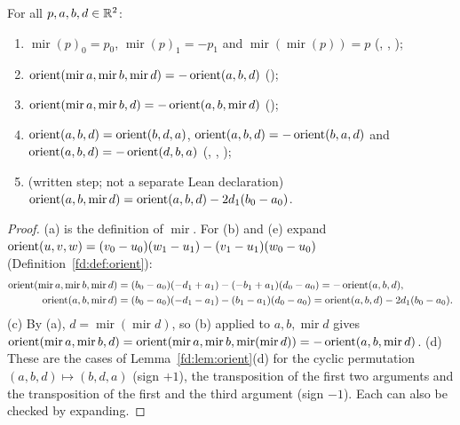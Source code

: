 \begin{lemma}\label{mm:lem:orient-mir}
For all $p,a,b,d\in\mathbb R^2$:
\begin{enumerate}[label=(\alph*)]
\item $\operatorname{mir}(p)_0=p_0$, $\operatorname{mir}(p)_1=-p_1$ and $\operatorname{mir}(\operatorname{mir}(p))=p$
  (, , );
\item $\operatorname{orient}(\operatorname{mir}a,\operatorname{mir}b,\operatorname{mir}d)=-\operatorname{orient}(a,b,d)$ ();
\item $\operatorname{orient}(\operatorname{mir}a,\operatorname{mir}b,d)=-\operatorname{orient}(a,b,\operatorname{mir}d)$ ();
\item $\operatorname{orient}(a,b,d)=\operatorname{orient}(b,d,a)$, $\operatorname{orient}(a,b,d)=-\operatorname{orient}(b,a,d)$ and $\operatorname{orient}(a,b,d)=-\operatorname{orient}(d,b,a)$
  (, , );
\item (written step; not a separate Lean declaration)
  $\operatorname{orient}(a,b,\operatorname{mir}d)=\operatorname{orient}(a,b,d)-2d_1(b_0-a_0)$.
\end{enumerate}
\end{lemma}

\begin{proof}
(a) is the definition of $\operatorname{mir}$. For (b) and (e) expand
$\operatorname{orient}(u,v,w)=(v_0-u_0)(w_1-u_1)-(v_1-u_1)(w_0-u_0)$ (Definition~\ref{fd:def:orient}):
\begin{align*}
\operatorname{orient}(\operatorname{mir}a,\operatorname{mir}b,\operatorname{mir}d)
  &=(b_0-a_0)(-d_1+a_1)-(-b_1+a_1)(d_0-a_0)=-\operatorname{orient}(a,b,d),\\
\operatorname{orient}(a,b,\operatorname{mir}d)
  &=(b_0-a_0)(-d_1-a_1)-(b_1-a_1)(d_0-a_0)=\operatorname{orient}(a,b,d)-2d_1(b_0-a_0).
\end{align*}
(c) By (a), $d=\operatorname{mir}(\operatorname{mir}d)$, so (b) applied to $a,b,\operatorname{mir}d$ gives
$\operatorname{orient}(\operatorname{mir}a,\operatorname{mir}b,d)
=\operatorname{orient}(\operatorname{mir}a,\operatorname{mir}b,\operatorname{mir}(\operatorname{mir}d))
=-\operatorname{orient}(a,b,\operatorname{mir}d)$.
(d) These are the cases of Lemma~\ref{fd:lem:orient}(d) for the cyclic permutation
$(a,b,d)\mapsto(b,d,a)$ (sign $+1$), the transposition of the first two arguments and the transposition
of the first and the third argument (sign $-1$). Each can also be checked by expanding.
\end{proof}

